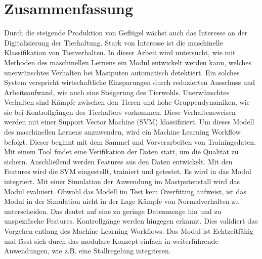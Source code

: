 \section*{Zusammenfassung}

Durch die steigende Produktion von Geflügel wächst auch das Interesse an der Digitalisierung der Tierhaltung. Stark von Interesse ist die maschinelle Klassifikation von Tierverhalten. In dieser Arbeit wird untersucht, wie mit Methoden des maschinellen Lernens ein Modul entwickelt werden kann, welches unerwünschtes Verhalten bei Mastputen automatisch detektiert. Ein solches System verspricht wirtschaftliche Einsparungen durch reduzierten Ausschuss und Arbeitsaufwand, wie auch eine Steigerung des Tierwohls. Unerwünschtes Verhalten sind Kämpfe zwischen den Tieren und hohe Gruppendynamiken, wie sie bei Kontrollgängen des Tierhalters vorkommen. Diese Verhaltensweisen werden mit einer Support Vector Machine (SVM) klassifiziert. Um dieses Modell des maschinellen Lernens anzuwenden, wird ein Machine Learning Workflow befolgt. Dieser beginnt mit dem Sammel und Vorverarbeiten von Trainingsdaten. Mit einem Tool findet eine Verifikation der Daten statt, um die Qualität zu sichern. Anschließend werden Features aus den Daten entwickelt. Mit den Features wird die SVM eingestellt, trainiert und getestet. Es wird in das Modul integriert. Mit einer Simulation der Anwendung im Mastputenstall wird das Modul evaluiert. Obwohl das Modell im Test kein Overfitting aufweist, ist das Modul in der Simulation nicht in der Lage Kämpfe von Normalverhalten zu unterscheiden. Das deutet auf eine zu geringe Datenmenge hin und zu unspezifische Features. Kontrollgänge werden hingegen erkannt. Dies validiert das Vorgehen entlang des Machine Learning Workflows. Das Modul ist Echtzeitfähig und lässt sich durch das modulare Konzept einfach in weiterführende Anwendungen, wie z.B. eine Stallregelung integrieren. 


